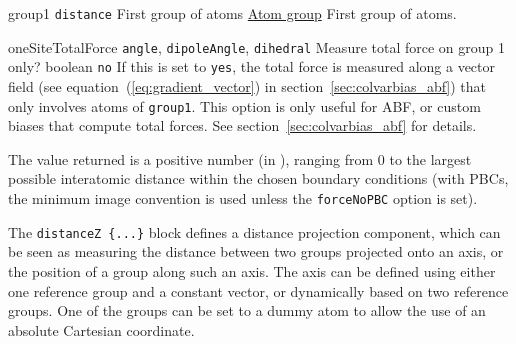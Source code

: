 \begin{cvcoptions}
\item %
  \key
    {group1}{%
    \texttt{distance}}{%
    First group of atoms}{%
    \hyperref[sec:colvar_atom_groups]{Atom group}}{%
    First group of atoms.}

\item %

\item %
  \keydef
    {oneSiteTotalForce}{%
    \texttt{angle}, \texttt{dipoleAngle}, \texttt{dihedral}}{%
    Measure total force on group 1 only?}{%
    boolean}{%
    \texttt{no}}{%
    If this is set to \texttt{yes}, the total force is measured along
    a vector field (see equation~(\ref{eq:gradient_vector}) in
    section~\ref{sec:colvarbias_abf}) that only involves atoms of
    \texttt{group1}.  This option is only useful for ABF, or custom
    biases that compute total forces.  See
    section~\ref{sec:colvarbias_abf} for details.}

\end{cvcoptions}

The value returned is a positive number (in \lengthunit), ranging from $0$
to the largest possible interatomic distance within the chosen
boundary conditions (with PBCs, the minimum image convention is used
unless the \texttt{forceNoPBC} option is set).



The \texttt{distanceZ~\{...\}} block defines a distance projection
component, which can be seen as measuring the distance between two
groups projected onto an axis, or the position of a group along such
an axis.  The axis can be defined using either one reference group and
a constant vector, or dynamically based on two reference groups.
One of the groups can be set to a dummy atom to allow the use of an absolute Cartesian coordinate.

